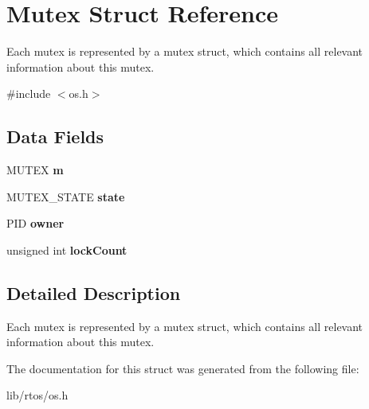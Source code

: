 \hypertarget{structMutex}{}\section{Mutex Struct Reference}
\label{structMutex}


Each mutex is represented by a mutex struct, which contains all relevant information about this mutex.  




{\ttfamily \#include $<$os.\+h$>$}

\subsection*{Data Fields}
\begin{DoxyCompactItemize}
\item 
\hypertarget{structMutex_a97453154964443ab57b08635f2c82c6c}{}M\+U\+T\+E\+X {\bfseries m}\label{structMutex_a97453154964443ab57b08635f2c82c6c}

\item 
\hypertarget{structMutex_afd67879b4bd1ac7cf173338a4f1350a6}{}M\+U\+T\+E\+X\+\_\+\+S\+T\+A\+T\+E {\bfseries state}\label{structMutex_afd67879b4bd1ac7cf173338a4f1350a6}

\item 
\hypertarget{structMutex_a3d0a0aef7b0a36cb4b69414195fec865}{}P\+I\+D {\bfseries owner}\label{structMutex_a3d0a0aef7b0a36cb4b69414195fec865}

\item 
\hypertarget{structMutex_a71c985f2a2609c89f0e8ca1a32d88027}{}unsigned int {\bfseries lock\+Count}\label{structMutex_a71c985f2a2609c89f0e8ca1a32d88027}

\end{DoxyCompactItemize}


\subsection{Detailed Description}
Each mutex is represented by a mutex struct, which contains all relevant information about this mutex. 

The documentation for this struct was generated from the following file\+:\begin{DoxyCompactItemize}
\item 
lib/rtos/os.\+h\end{DoxyCompactItemize}
